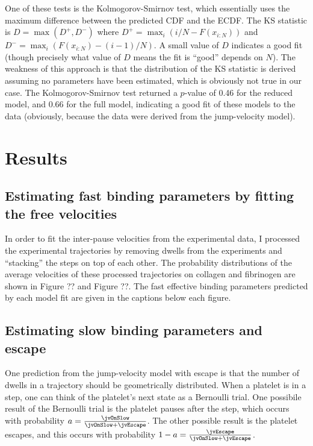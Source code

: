 One of these tests is the Kolmogorov-Smirnov test, which essentially
uses the maximum difference between the predicted CDF and the
ECDF. The KS statistic is $D = \max(D^+, D^-)$ where
$D^+ = \max_i(i/N - F(x_{i:N}))$ and
$D^- = \max_i(F(x_{i:N}) - (i - 1)/N)$. A small value of $D$ indicates
a good fit (though precisely what value of $D$ means the fit is
``good'' depends on $N$). The weakness of this approach is that the
distribution of the KS statistic is derived assuming no parameters
have been estimated, which is obviously not true in our case. The
Kolmogorov-Smirnov test returned a $p$-value of 0.46 for the reduced
model, and 0.66 for the full model, indicating a good fit of these
models to the data (obviously, because the data were derived from the
jump-velocity model).

\section{Results}
\label{sec:results-jump-velocity}

\subsection{Estimating fast binding parameters by fitting the free
  velocities}
\label{sec:estim-fast-bind}

In order to fit the inter-pause velocities from the experimental data,
I processed the experimental trajectories by removing dwells from the
experiments and ``stacking'' the steps on top of each other. The
probability distributions of the average velocities of these processed
trajectories on collagen and fibrinogen are shown in Figure ?? and
Figure ??. The fast effective binding parameters predicted by each
model fit are given in the captions below each figure.


\subsection{Estimating slow binding parameters and escape}
\label{sec:estim-slow-bind}

One prediction from the jump-velocity model with escape is that the
number of dwells in a trajectory should be geometrically
distributed. When a platelet is in a step, one can think of the
platelet's next state as a Bernoulli trial. One possibile result of
the Bernoulli trial is the platelet pauses after the step, which
occurs with probability
$a = \frac{\jvOnSlow}{\jvOnSlow + \jvEscape}$. The other possible
result is the platelet escapes, and this occurs with probability $1 -
a = \frac{\jvEscape}{\jvOnSlow + \jvEscape}$.

